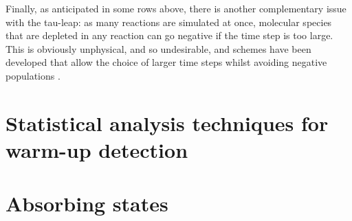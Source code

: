 \documentclass[12pt,a4paper]{report}
\begin{document}
Finally, as anticipated in some rows above, there is another complementary issue with the tau-leap: as many reactions are simulated at once, molecular species that are depleted in any reaction can go negative if the time step is too large. This is obviously unphysical, and so undesirable, and schemes have been developed that allow the choice of larger time steps whilst avoiding negative populations \cite{Article}.
\section{Statistical analysis techniques for warm-up detection}

\section{Absorbing states}
\end{document}
